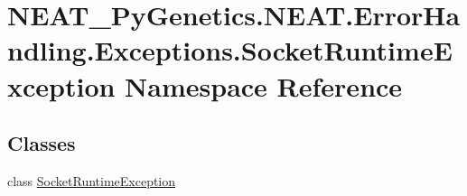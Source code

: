 \hypertarget{namespaceNEAT__PyGenetics_1_1NEAT_1_1ErrorHandling_1_1Exceptions_1_1SocketRuntimeException}{}\section{N\+E\+A\+T\+\_\+\+Py\+Genetics.\+N\+E\+A\+T.\+Error\+Handling.\+Exceptions.\+Socket\+Runtime\+Exception Namespace Reference}
\label{namespaceNEAT__PyGenetics_1_1NEAT_1_1ErrorHandling_1_1Exceptions_1_1SocketRuntimeException}
\subsection*{Classes}
\begin{DoxyCompactItemize}
\item 
class \hyperlink{classNEAT__PyGenetics_1_1NEAT_1_1ErrorHandling_1_1Exceptions_1_1SocketRuntimeException_1_1SocketRuntimeException}{Socket\+Runtime\+Exception}
\end{DoxyCompactItemize}
